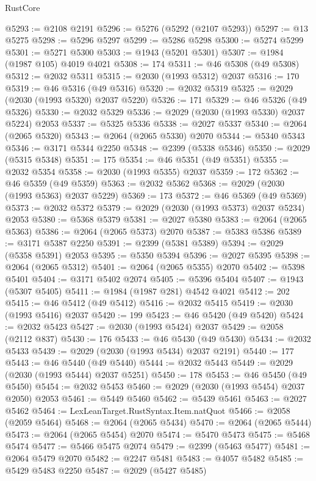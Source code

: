 \begin{lexlean}{RustCore}
\begin{coremodule}
@5293 := @2108 @2191
@5296 := @5276 (@5292 (@2107 @5293))
@5297 := @13 @5275
@5298 := @5296 @5297
@5299 := @5286 @5298
@5300 := @5274 @5299
@5301 := @5271 @5300
@5303 := @1943 (@5201 @5301)
@5307 := @1984 (@1987 @105) @4019 @4021
@5308 := 174
@5311 := @46 @5308 (@49 @5308)
@5312 := @2032 @5311
@5315 := @2030 (@1993 @5312) @2037
@5316 := 170
@5319 := @46 @5316 (@49 @5316)
@5320 := @2032 @5319
@5325 := @2029 (@2030 (@1993 @5320) @2037 @5220)
@5326 := 171
@5329 := @46 @5326 (@49 @5326)
@5330 := @2032 @5329
@5336 := @2029 (@2030 (@1993 @5330) @2037 @5224) @2053
@5337 := @5325 @5336
@5338 := @2027 @5337
@5340 := @2064 (@2065 @5320)
@5343 := @2064 (@2065 @5330) @2070
@5344 := @5340 @5343
@5346 := @3171 @5344 @2250
@5348 := @2399 (@5338 @5346)
@5350 := @2029 (@5315 @5348)
@5351 := 175
@5354 := @46 @5351 (@49 @5351)
@5355 := @2032 @5354
@5358 := @2030 (@1993 @5355) @2037
@5359 := 172
@5362 := @46 @5359 (@49 @5359)
@5363 := @2032 @5362
@5368 := @2029 (@2030 (@1993 @5363) @2037 @5229)
@5369 := 173
@5372 := @46 @5369 (@49 @5369)
@5373 := @2032 @5372
@5379 := @2029 (@2030 (@1993 @5373) @2037 @5234) @2053
@5380 := @5368 @5379
@5381 := @2027 @5380
@5383 := @2064 (@2065 @5363)
@5386 := @2064 (@2065 @5373) @2070
@5387 := @5383 @5386
@5389 := @3171 @5387 @2250
@5391 := @2399 (@5381 @5389)
@5394 := @2029 (@5358 @5391) @2053
@5395 := @5350 @5394
@5396 := @2027 @5395
@5398 := @2064 (@2065 @5312)
@5401 := @2064 (@2065 @5355) @2070
@5402 := @5398 @5401
@5404 := @3171 @5402 @2074
@5405 := @5396 @5404
@5407 := @1943 (@5307 @5405)
@5411 := @1984 (@1987 @281) @4542 @4021
@5412 := 202
@5415 := @46 @5412 (@49 @5412)
@5416 := @2032 @5415
@5419 := @2030 (@1993 @5416) @2037
@5420 := 199
@5423 := @46 @5420 (@49 @5420)
@5424 := @2032 @5423
@5427 := @2030 (@1993 @5424) @2037
@5429 := @2058 (@2112 @837)
@5430 := 176
@5433 := @46 @5430 (@49 @5430)
@5434 := @2032 @5433
@5439 := @2029 (@2030 (@1993 @5434) @2037 @2191)
@5440 := 177
@5443 := @46 @5440 (@49 @5440)
@5444 := @2032 @5443
@5449 := @2029 (@2030 (@1993 @5444) @2037 @5251)
@5450 := 178
@5453 := @46 @5450 (@49 @5450)
@5454 := @2032 @5453
@5460 := @2029 (@2030 (@1993 @5454) @2037 @2050) @2053
@5461 := @5449 @5460
@5462 := @5439 @5461
@5463 := @2027 @5462
@5464 := LexLeanTarget.RustSyntax.Item.natQuot
@5466 := @2058 (@2059 @5464)
@5468 := @2064 (@2065 @5434)
@5470 := @2064 (@2065 @5444)
@5473 := @2064 (@2065 @5454) @2070
@5474 := @5470 @5473
@5475 := @5468 @5474
@5477 := @5466 @5475 @2074
@5479 := @2399 (@5463 @5477)
@5481 := @2064 @5479 @2070
@5482 := @2247 @5481
@5483 := @4057 @5482
@5485 := @5429 @5483 @2250
@5487 := @2029 (@5427 @5485)

\end{coremodule}
\end{lexlean}
